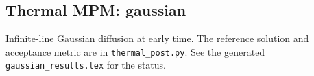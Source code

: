 \subsection{Thermal MPM: gaussian}
Infinite-line Gaussian diffusion at early time. The reference solution and acceptance metric are in \texttt{thermal\_post.py}. See the generated \texttt{gaussian\_results.tex} for the status.
